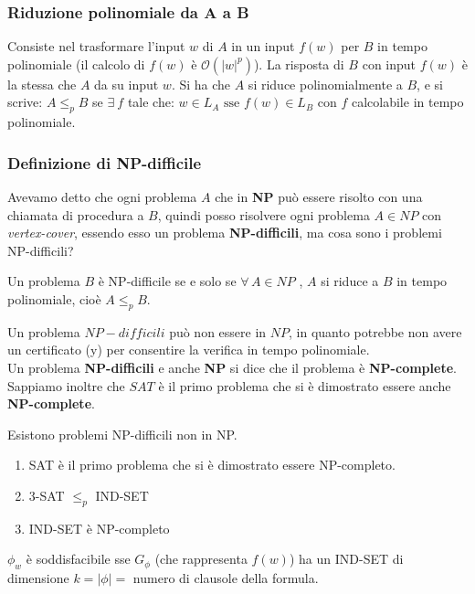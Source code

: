 \subsubsection{Riduzione polinomiale da A a B}
Consiste nel trasformare l’input $w$ di $A$ in un input $f(w)$ per $B$ in tempo polinomiale (il calcolo di $f(w)$ è $\mathcal{O} (|w|^p)$). La risposta di $B$ con input $f(w)$  è la stessa che $A$ da su input $w$.
Si ha che $A$ si riduce polinomialmente a $B$, e si scrive: $A\leq_p B$ se $\exists \ f$ tale che: $w \in L_A\mbox{ sse } f(w)\in L_B$ con $f$ calcolabile in tempo polinomiale.

\subsubsection{Definizione di NP-difficile}
Avevamo detto che ogni problema $A$ che in \textbf{NP} può essere risolto con una chiamata di procedura a $B$, quindi posso risolvere ogni problema $A\in NP$ con \textit{vertex-cover}, essendo esso un problema \textbf{NP-difficili}, ma cosa sono i problemi NP-difficili?

Un problema $B$ è NP-difficile se e solo se $\forall \, A \in NP$ , $A$ si riduce a $B$ in tempo polinomiale, cioè $A \leq_p B$.

Un problema $NP-difficili$ può non essere in $NP$, in quanto potrebbe non avere un certificato (y) per consentire la verifica in tempo polinomiale. \\ 
Un problema \textbf{NP-difficili} e anche \textbf{NP} si dice che il problema è \textbf{NP-complete}. Sappiamo inoltre che $SAT$ è il primo problema che si è dimostrato essere anche \textbf{NP-complete}.

Esistono problemi NP-difficili non in NP.

\begin{enumerate}
    \item SAT è il primo problema che si è dimostrato essere NP-completo.
    \item 3-SAT $\leq_p$ IND-SET
    \item IND-SET è NP-completo
\end{enumerate}

$\phi_w$ è soddisfacibile sse $G_\phi$ (che rappresenta $f(w)$) ha un IND-SET di dimensione $k=|\phi| = $ numero di clausole della formula.

